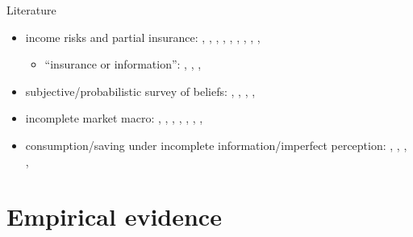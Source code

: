 \documentclass{beamer}
\begin{document}
\begin{frame}{Literature}
	\begin{itemize}
		\item income risks and partial insurance: {\scriptsize\cite{gottschalk1994growth}, \cite{carroll1997nature}, \cite{meghir2004income}, \cite{storesletten2004cyclical}, \cite{blundell_consumption_2008}, \cite{moffitt2002trends}, \cite{low2010wage},  \cite{guvenen2014nature},  \cite{arellano2017earnings}, \cite{bloom2018great}}
		\begin{itemize}
			\item ``insurance or information'': {\scriptsize \cite{pistaferri_superior_2001}, \cite{kaufmann_disentangling_2009}, \cite{meghir2011earnings}, \cite{kaplan2010much}}
		\end{itemize}
		\item subjective/probabilistic survey of beliefs: {\scriptsize\cite{manski_measuring_2004}, \cite{delavande2011measuring}, \cite{manski_survey_2018},  \cite{bertrand_people_2001}, \cite{armantier_overview_2017}} 
		\item incomplete market macro: {\scriptsize\cite{bewley1976permanent}, 
		 \cite{aiyagari1994uninsured},
		\cite{huggett1996wealth}, \cite{krusell1998income}, \cite{heathcote2009quantitative},  \cite{carroll2017distribution}, \cite{krueger2016macroeconomics},  \cite{bayer2019precautionary}}
		\item consumption/saving under incomplete information/imperfect perception:  {\scriptsize\cite{pischke1995individual}, \cite{wang2004precautionary}, \cite{rozsypal_overpersistence_2017}, \cite{carroll_sticky_2018}, \cite{lian2019imperfect}}
	
	\end{itemize}
\end{frame}


\section{Empirical evidence}
\end{document}
